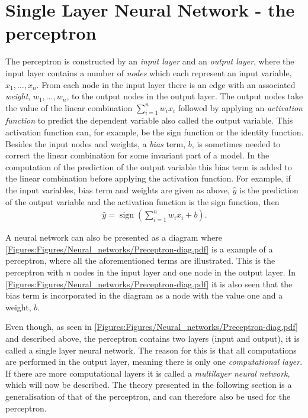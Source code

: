 \section{Single Layer Neural Network - the perceptron} 
The perceptron is constructed by an \emph{input layer} and an \emph{output layer}, where the input layer contains a number of \emph{nodes} which each represent an input variable, $x_1, \ldots, x_n$. From each node in the input layer there is an edge with an associated \emph{weight}, $w_1, \ldots, w_n$, to the output nodes in the output layer. The output nodes take the value of the linear combination $\sum_{i = 1}^n w_ix_i$ followed by applying an \emph{activation function} to predict the dependent variable also called the output variable. This activation function can, for example, be the sign function or the identity function. Besides the input nodes and weights, a \emph{bias} term, $b$, is sometimes needed to correct the linear combination for some invariant part of a model. In the computation of the prediction of the output variable this bias term is added to the linear combination before applying the activation function. For example, if the input variables, bias term and weights are given as above, $\hat{y}$ is the prediction of the output variable and the activation function is the sign function, then
\begin{align}\label{eq:sign_perceptron_output}
    \hat{y} =  \operatorname{sign}\left(\sum_{i=1}^n w_ix_i + b\right).
\end{align}
 
A neural network can also be presented as a diagram where \autoref{Figures:Figures/Neural_networks/Preceptron-diag.pdf} is a example of a perceptron, where all the aforementioned terms are illustrated. This is the perceptron with $n$ nodes in the input layer and one node in the output layer. In \autoref{Figures:Figures/Neural_networks/Preceptron-diag.pdf} it is also seen that the bias term is incorporated in the diagram as a node with the value one and a weight, $b$.


Even though, as seen in \autoref{Figures:Figures/Neural_networks/Preceptron-diag.pdf} and described above, the perceptron contains two layers (input and output), it is called a single layer neural network. The reason for this is that all computations are performed in the output layer, meaning there is only one \emph{computational layer}. If there are more computational layers it is called a \emph{multilayer neural network}, which will now be described. The theory presented in the following section is a generalisation of that of the perceptron, and can therefore also be used for the perceptron. 


